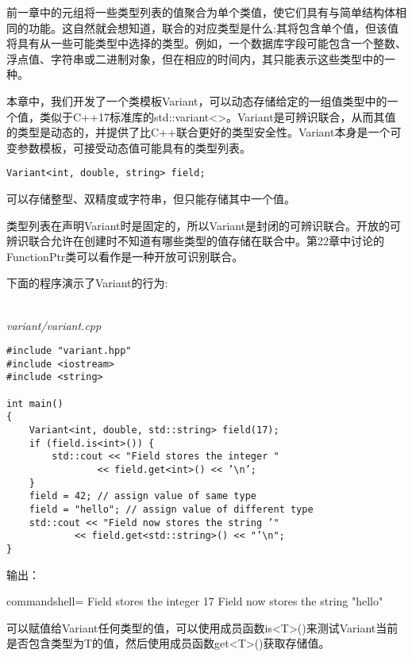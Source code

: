 前一章中的元组将一些类型列表的值聚合为单个类值，使它们具有与简单结构体相同的功能。这自然就会想知道，联合的对应类型是什么:其将包含单个值，但该值将具有从一些可能类型中选择的类型。例如，一个数据库字段可能包含一个整数、浮点值、字符串或二进制对象，但在相应的时间内，其只能表示这些类型中的一种。

本章中，我们开发了一个类模板Variant，可以动态存储给定的一组值类型中的一个值，类似于C++17标准库的std::variant<>。Variant是可辨识联合，从而其值的类型是动态的，并提供了比C++联合更好的类型安全性。Variant本身是一个可变参数模板，可接受动态值可能具有的类型列表。

\begin{lstlisting}[style=styleCXX]
Variant<int, double, string> field;
\end{lstlisting}

可以存储整型、双精度或字符串，但只能存储其中一个值。

\begin{tcolorbox}[colback=webgreen!5!white,colframe=webgreen!75!black]
\hspace*{0.75cm}类型列表在声明Variant时是固定的，所以Variant是封闭的可辨识联合。开放的可辨识联合允许在创建时不知道有哪些类型的值存储在联合中。第22章中讨论的FunctionPtr类可以看作是一种开放可识别联合。
\end{tcolorbox}

下面的程序演示了Variant的行为:

\hspace*{\fill} \\ %
\noindent
\textit{variant/variant.cpp}
\begin{lstlisting}[style=styleCXX]
#include "variant.hpp"
#include <iostream>
#include <string>
 
int main()
{
	Variant<int, double, std::string> field(17);
	if (field.is<int>()) {
		std::cout << "Field stores the integer "
				<< field.get<int>() << ’\n’;
	}
	field = 42; // assign value of same type
	field = "hello"; // assign value of different type
	std::cout << "Field now stores the string ’"
			<< field.get<std::string>() << "’\n";
}
\end{lstlisting}

输出：

\begin{tcblisting}{commandshell={}}
Field stores the integer 17
Field now stores the string "hello"
\end{tcblisting}

可以赋值给Variant任何类型的值，可以使用成员函数is<T>()来测试Variant当前是否包含类型为T的值，然后使用成员函数get<T>()获取存储值。































